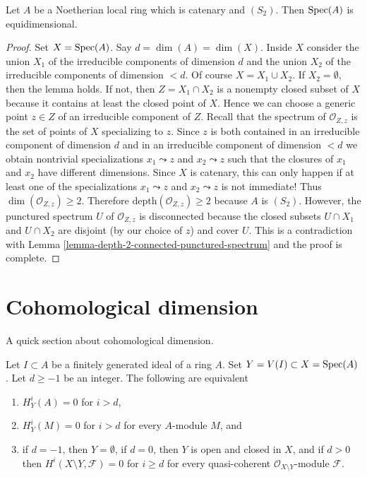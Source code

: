 \begin{lemma}
\label{lemma-catenary-S2-equidimensional}
\begin{reference}
\cite[IV Corollary 5.10.9]{EGA}
\end{reference}
Let $A$ be a Noetherian local ring which is catenary and $(S_2)$.
Then $\mathop{\mathrm{Spec}}(A)$ is equidimensional.
\end{lemma}

\begin{proof}
Set $X = \mathop{\mathrm{Spec}}(A)$. Say $d = \dim(A) = \dim(X)$. Inside $X$ consider the
union $X_1$ of the irreducible components of dimension $d$ and the union
$X_2$ of the irreducible components of dimension $< d$. Of course
$X = X_1 \cup X_2$. If $X_2 = \emptyset$,
then the lemma holds. If not, then $Z = X_1 \cap X_2$ is a nonempty closed
subset of $X$ because it contains at least the closed point of $X$.
Hence we can choose a generic point $z \in Z$ of an irreducible component
of $Z$. Recall that the spectrum of $\mathcal{O}_{Z, z}$ is the set of points
of $X$ specializing to $z$. Since $z$ is both contained in an
irreducible component of dimension $d$ and in an irreducible component
of dimension $< d$ we obtain nontrivial specializations $x_1 \leadsto z$ and
$x_2 \leadsto z$ such that the closures of $x_1$ and $x_2$ have different
dimensions. Since $X$ is catenary, this can only happen if at least
one of the specializations $x_1 \leadsto z$ and $x_2 \leadsto z$ is not
immediate! Thus $\dim(\mathcal{O}_{Z, z}) \geq 2$. Therefore
$\text{depth}(\mathcal{O}_{Z, z}) \geq 2$ because $A$ is $(S_2)$.
However, the punctured spectrum $U$ of $\mathcal{O}_{Z, z}$ is disconnected
because the closed subsets $U \cap X_1$ and $U \cap X_2$ are disjoint
(by our choice of $z$) and cover $U$. This is a contradiction with
Lemma \ref{lemma-depth-2-connected-punctured-spectrum}
and the proof is complete.
\end{proof}



\section{Cohomological dimension}
\label{section-cd}

\noindent
A quick section about cohomological dimension.

\begin{lemma}
\label{lemma-cd}
Let $I \subset A$ be a finitely generated ideal of a ring $A$.
Set $Y = V(I) \subset X = \mathop{\mathrm{Spec}}(A)$. Let $d \geq -1$ be an integer.
The following are equivalent
\begin{enumerate}
\item $H^i_Y(A) = 0$ for $i > d$,
\item $H^i_Y(M) = 0$ for $i > d$ for every $A$-module $M$, and
\item if $d = -1$, then $Y = \emptyset$, if $d = 0$, then
$Y$ is open and closed in $X$, and if $d > 0$ then
$H^i(X \setminus Y, \mathcal{F}) = 0$ for $i \geq d$
for every quasi-coherent $\mathcal{O}_{X \setminus Y}$-module $\mathcal{F}$.
\end{enumerate}
\end{lemma}

